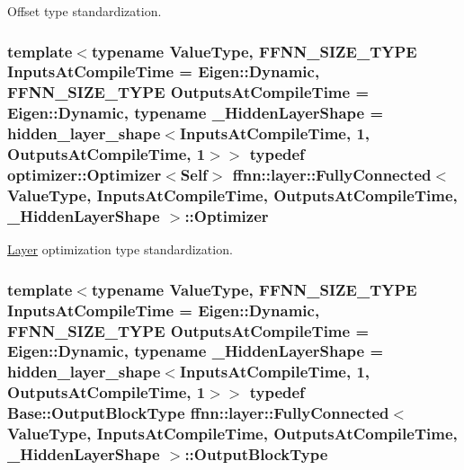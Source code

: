 Offset type standardization. 

\hypertarget{classffnn_1_1layer_1_1_fully_connected_abae398e6ffb06d183654e5ff11857a03}{
\subsubsection[{Optimizer}]{\setlength{\rightskip}{0pt plus 5cm}template$<$typename Value\-Type, F\-F\-N\-N\-\_\-\-S\-I\-Z\-E\-\_\-\-T\-Y\-P\-E Inputs\-At\-Compile\-Time = Eigen\-::\-Dynamic, F\-F\-N\-N\-\_\-\-S\-I\-Z\-E\-\_\-\-T\-Y\-P\-E Outputs\-At\-Compile\-Time = Eigen\-::\-Dynamic, typename \-\_\-\-Hidden\-Layer\-Shape = hidden\-\_\-layer\-\_\-shape$<$\-Inputs\-At\-Compile\-Time, 1, Outputs\-At\-Compile\-Time, 1$>$$>$ typedef {\bf optimizer\-::\-Optimizer}$<${\bf Self}$>$ {\bf ffnn\-::layer\-::\-Fully\-Connected}$<$ Value\-Type, Inputs\-At\-Compile\-Time, Outputs\-At\-Compile\-Time, \-\_\-\-Hidden\-Layer\-Shape $>$\-::{\bf Optimizer}}}\label{classffnn_1_1layer_1_1_fully_connected_abae398e6ffb06d183654e5ff11857a03}


\hyperlink{classffnn_1_1layer_1_1_layer}{Layer} optimization type standardization. 

\hypertarget{classffnn_1_1layer_1_1_fully_connected_a23903ba58825efec173f318ffdc3b998}{
\subsubsection[{Output\-Block\-Type}]{\setlength{\rightskip}{0pt plus 5cm}template$<$typename Value\-Type, F\-F\-N\-N\-\_\-\-S\-I\-Z\-E\-\_\-\-T\-Y\-P\-E Inputs\-At\-Compile\-Time = Eigen\-::\-Dynamic, F\-F\-N\-N\-\_\-\-S\-I\-Z\-E\-\_\-\-T\-Y\-P\-E Outputs\-At\-Compile\-Time = Eigen\-::\-Dynamic, typename \-\_\-\-Hidden\-Layer\-Shape = hidden\-\_\-layer\-\_\-shape$<$\-Inputs\-At\-Compile\-Time, 1, Outputs\-At\-Compile\-Time, 1$>$$>$ typedef {\bf Base\-::\-Output\-Block\-Type} {\bf ffnn\-::layer\-::\-Fully\-Connected}$<$ Value\-Type, Inputs\-At\-Compile\-Time, Outputs\-At\-Compile\-Time, \-\_\-\-Hidden\-Layer\-Shape $>$\-::{\bf Output\-Block\-Type}}}\label{classffnn_1_1layer_1_1_fully_connected_a23903ba58825efec173f318ffdc3b998}


